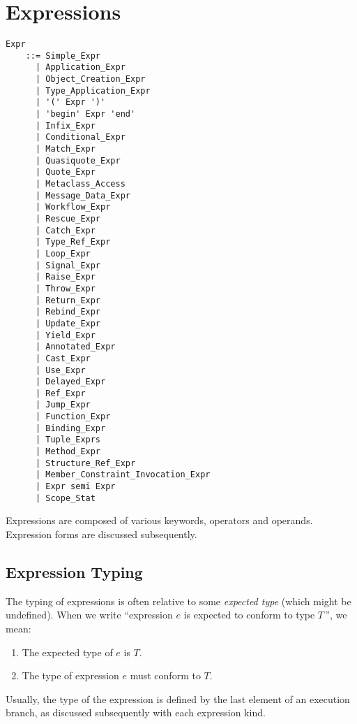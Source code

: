 
\chapter{Expressions}

\minitoc

\newpage

\grammar\begin{lstlisting}
Expr        
    ::= Simple_Expr
      | Application_Expr
      | Object_Creation_Expr
      | Type_Application_Expr
      | '(' Expr ')'
      | 'begin' Expr 'end'
      | Infix_Expr
      | Conditional_Expr
      | Match_Expr
      | Quasiquote_Expr
      | Quote_Expr
      | Metaclass_Access
      | Message_Data_Expr
      | Workflow_Expr
      | Rescue_Expr
      | Catch_Expr
      | Type_Ref_Expr
      | Loop_Expr
      | Signal_Expr
      | Raise_Expr
      | Throw_Expr
      | Return_Expr
      | Rebind_Expr
      | Update_Expr
      | Yield_Expr
      | Annotated_Expr
      | Cast_Expr
      | Use_Expr
      | Delayed_Expr
      | Ref_Expr
      | Jump_Expr
      | Function_Expr
      | Binding_Expr
      | Tuple_Exprs
      | Method_Expr
      | Structure_Ref_Expr
      | Member_Constraint_Invocation_Expr
      | Expr semi Expr
      | Scope_Stat
\end{lstlisting}

Expressions are composed of various keywords, operators and operands. Expression forms are discussed subsequently. 







\section{Expression Typing}
\label{sec:expression-typing}

The typing of expressions is often relative to some {\em expected type} (which might be undefined). When we write ``expression $e$ is expected to conform to type $T$\,'', we mean:
\begin{enumerate}
  \item The expected type of $e$ is $T$.
  \item The type of expression $e$ must conform to $T$. 
\end{enumerate}

Usually, the type of the expression is defined by the last element of an execution branch, as discussed subsequently with each expression kind. 

